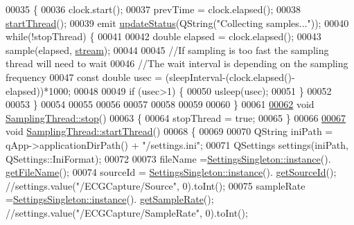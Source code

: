 \begin{DoxyCode}
00035 \{
00036     clock.start();
00037         prevTime = clock.elapsed();
00038         \hyperlink{classSamplingThread_ab1284bf5429771100bf0a60ffe3aacef}{startThread}();
00039         emit \hyperlink{classDeviceInterface_ac64a65f54f41f0b7ff4c846ac7fdbef7}{updateStatus}(QString(\textcolor{stringliteral}{"Collecting samples..."}));
00040         \textcolor{keywordflow}{while}(!stopThread) \{
00041 
00042             \textcolor{keywordtype}{double} elapsed = clock.elapsed();
00043             sample(elapsed, \hyperlink{classDeviceInterface_ac98f5cd34bafb43265436b29b9f734fa}{stream});
00044 
00045             \textcolor{comment}{//If sampling is too fast the sampling thread will need to wait}
00046             \textcolor{comment}{//The wait interval is depending on the sampling frequency}
00047             \textcolor{keyword}{const} \textcolor{keywordtype}{double} usec = (sleepInterval-(clock.elapsed()-elapsed))*1000;
00048 
00049             \textcolor{keywordflow}{if} (usec>1) \{
00050                 usleep(usec);
00051             \}
00052 
00053         \}
00054 
00055 
00056 
00057 
00058 
00059 
00060 \}
00061 
\hypertarget{samplingthread_8cpp_source.tex_l00062}{}\hyperlink{classSamplingThread_a6e758c7b8266755c201ca002520f5e2e}{00062} \textcolor{keywordtype}{void} \hyperlink{classSamplingThread_a6e758c7b8266755c201ca002520f5e2e}{SamplingThread::stop}()
00063 \{
00064     stopThread = \textcolor{keyword}{true};
00065 \}
00066 
\hypertarget{samplingthread_8cpp_source.tex_l00067}{}\hyperlink{classSamplingThread_ab1284bf5429771100bf0a60ffe3aacef}{00067} \textcolor{keywordtype}{void} \hyperlink{classSamplingThread_ab1284bf5429771100bf0a60ffe3aacef}{SamplingThread::startThread}()
00068 \{
00069 
00070     QString iniPath = qApp->applicationDirPath() + \textcolor{stringliteral}{"/settings.ini"};
00071     QSettings settings(iniPath, QSettings::IniFormat);
00072 
00073     fileName =\hyperlink{classSettingsSingleton_aad528becd7ce5903c418a5b8b718074c}{SettingsSingleton::instance}().
      \hyperlink{classSettingsSingleton_aa5c7ee7b9966f8391d7431a7e8ab3949}{getFileName}();
00074     sourceId = \hyperlink{classSettingsSingleton_aad528becd7ce5903c418a5b8b718074c}{SettingsSingleton::instance}().
      \hyperlink{classSettingsSingleton_aa6db88481c421b96974519b8e28192c9}{getSourceId}(); \textcolor{comment}{//settings.value("/ECGCapture/Source", 0).toInt();}
00075     sampleRate =\hyperlink{classSettingsSingleton_aad528becd7ce5903c418a5b8b718074c}{SettingsSingleton::instance}().
      \hyperlink{classSettingsSingleton_a11896cc46cb374ae6a8234e1cd3cb68f}{getSampleRate}(); \textcolor{comment}{//settings.value("/ECGCapture/SampleRate", 0).toInt();}

\end{DoxyCode}
